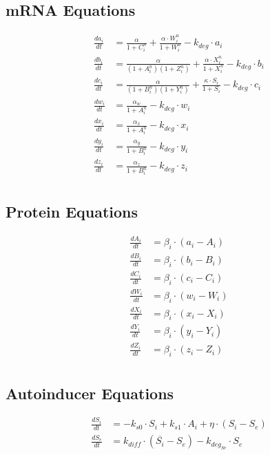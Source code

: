 \documentclass[fleqn]{article}
\begin{document}
\subsection*{mRNA Equations}
\begin{align*}
\frac{da_i}{dt} &= \frac{\alpha}{1 + C_i^n} +  \frac{\alpha \cdot W_i^n}{1 + W_i^n} - k_{deg} \cdot a_i \\
\frac{db_i}{dt} &= \frac{\alpha}{(1 + A_i^n)(1 + Z_i^n)} + \frac{\alpha \cdot X_i^n}{1 + X_i^n} - k_{deg} \cdot b_i \\
\frac{dc_i}{dt} &= \frac{\alpha}{(1 + B_i^n)(1 + Y_i^n)} + \frac{\kappa \cdot S_i}{1 + S_i} - k_{deg} \cdot c_i \\
\frac{dw_i}{dt} &= \frac{\alpha_w}{1 + A_i^n} - k_{deg} \cdot w_i \\
\frac{dx_i}{dt} &= \frac{\alpha_x}{1 + A_i^n} - k_{deg} \cdot x_i \\
\frac{dy_i}{dt} &= \frac{\alpha_y}{1 + B_i^n} - k_{deg} \cdot y_i \\
\frac{dz_i}{dt} &= \frac{\alpha_z}{1 + B_i^n} - k_{deg} \cdot z_i \\
\end{align*}

\subsection*{Protein Equations}
\begin{align*}
\frac{dA_i}{dt} &= \beta_i \cdot (a_i - A_i) \\
\frac{dB_i}{dt} &= \beta_i \cdot (b_i - B_i) \\
\frac{dC_i}{dt} &= \beta_i \cdot (c_i - C_i) \\
\frac{dW_i}{dt} &= \beta_i \cdot (w_i - W_i) \\
\frac{dX_i}{dt} &= \beta_i \cdot (x_i - X_i) \\
\frac{dY_i}{dt} &= \beta_i \cdot (y_i - Y_i) \\
\frac{dZ_i}{dt} &= \beta_i \cdot (z_i - Z_i) \\
\end{align*}

\subsection*{Autoinducer Equations}
\begin{align*}
\frac{dS_i}{dt} &= -k_{s0} \cdot S_i + k_{s1} \cdot A_i + \eta \cdot (S_i - S_e) \\
\frac{dS_e}{dt} &= k_{diff} \cdot (\overline{S_i} - S_e) - k_{deg_{Se}} \cdot S_e \\
\end{align*}
\end{document}
